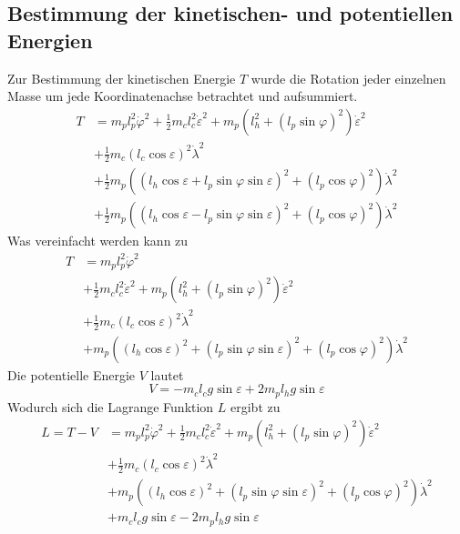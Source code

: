 \documentclass[times, 10pt,twocolumn]{article}
\begin{document}
	\subsection{Bestimmung der kinetischen- und potentiellen Energien}
	Zur Bestimmung der kinetischen Energie $T$ wurde die Rotation jeder einzelnen Masse um jede Koordinatenachse betrachtet und aufsummiert.
	\begin{equation}
	\begin{split}
	T&= m_p l_p^2\dot{\varphi}^2 + \frac{1}{2}m_cl_c^2\dot{\varepsilon}^2 
	+ m_p(l_h^2+(l_p\sin \varphi)^2)\dot{\varepsilon}^2\\
	&+ \frac{1}{2} m_c (l_c \cos \varepsilon)^2\dot{\lambda}^2\\
	&+ \frac{1}{2} m_p((l_h \cos \varepsilon +l_p \sin \varphi \sin \varepsilon)^2+(l_p \cos \varphi)^2)\dot{\lambda}^2\\
	&+ \frac{1}{2} m_p((l_h \cos \varepsilon -l_p \sin \varphi \sin \varepsilon)^2+(l_p \cos \varphi)^2)\dot{\lambda}^2
	\end{split}
	\end{equation}
	Was vereinfacht werden kann zu
	\begin{equation}
	\begin{split}
	T&= m_p l_p^2\dot{\varphi}^2 \\
	&+ \frac{1}{2}m_cl_c^2\dot{\varepsilon}^2 
	+ m_p(l_h^2+(l_p\sin \varphi)^2)\dot{\varepsilon}^2\\
	&+ \frac{1}{2} m_c (l_c \cos \varepsilon)^2\dot{\lambda}^2\\
	&+ m_p((l_h \cos \varepsilon)^2 + (l_p \sin \varphi \sin \varepsilon)^2+(l_p \cos \varphi)^2)\dot{\lambda}^2
	\end{split}
	\end{equation}
	Die potentielle Energie $V$ lautet
	\begin{equation}
	V = -m_c l_c g \sin \varepsilon + 2 m_p l_h g \sin \varepsilon
	\end{equation}
	Wodurch sich die Lagrange Funktion $L$ ergibt zu 
	\begin{equation}
	\begin{split}
	L = T - V&= m_p l_p^2\dot{\varphi}^2 + \frac{1}{2}m_cl_c^2\dot{\varepsilon}^2 
	+ m_p(l_h^2+(l_p\sin \varphi)^2)\dot{\varepsilon}^2\\
	&+ \frac{1}{2} m_c (l_c \cos \varepsilon)^2\dot{\lambda}^2\\
	&+ m_p((l_h \cos \varepsilon)^2 + (l_p \sin \varphi \sin \varepsilon)^2+(l_p \cos \varphi)^2)\dot{\lambda}^2\\
	&+ m_c l_c g \sin \varepsilon - 2 m_p l_h g \sin \varepsilon
	\end{split}
	\end{equation}
\end{document}
